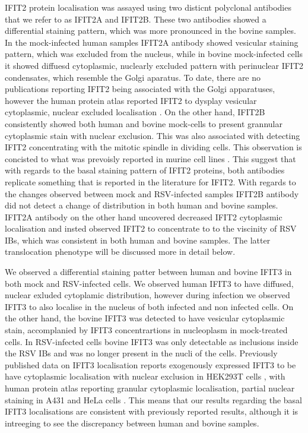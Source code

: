 IFIT2 protein localisation was assayed using two disticnt polyclonal antibodies that we refer to as IFIT2A and IFIT2B. These two antibodies showed a differential staining pattern, which was more pronounced in the bovine samples. In the mock-infected human samples IFIT2A antibody showed vesicular staining pattern, which was excluded from the nucleus, while in bovine mock-infected cells it showed diffuesd cytoplasmic, nuclearly excluded pattern with perinuclear IFIT2 condensates, which resemble the Golgi aparatus. To date, there are no publications reporting IFIT2 being associated with the Golgi apparatuses, however the human protein atlas reported IFIT2 to dysplay vesicular cytoplasmic, nuclear excluded localisation \cite{Thul2017AProteome}. On the other hand, IFIT2B consistently showed both human and bovine mock-cells to present grannular cytoplasmic stain with nuclear exclusion. This was also associated with detecting IFIT2 concentrating with the mitotic spindle in dividing cells. This observation is concisted to what was prevoisly reported in murine cell lines \cite{Saha2006IdentificationProtein}. This suggest that with regards to the basal staining pattern of IFIT2 proteins, both antibodies replicate something that is reported in the literature for IFIT2. With regards to the changes observed between mock and RSV-infected samples IFIT2B antibody did not detect a change of distribution in both human and bovine samples. IFIT2A antibody on the other hand uncovered decreased IFIT2 cytoplasmic localisation and insted observed IFIT2 to concentrate to to the viscinity of RSV IBs, which was consistent in both human and bovine samples. The latter translocation phenotype will be discussed more in detail below.

We observed a differential staining patter between human and bovine IFIT3 in both mock and RSV-infected cells. We observed human IFIT3 to have diffused, nuclear exluded cytoplamic distribution, however during infection we observed IFIT3 to also localise in the nucleus of both infected and non infected cells. On the other hand, the bovine IFIT3 was detected to have vesicular cytoplasmic stain, accomplanied by IFIT3 concentrartions in nucleoplasm in mock-treated cells. In RSV-infected cells bovine  IFIT3 was only detectable as inclusions inside the RSV IBs and was no longer present in the nucli of the cells. Previously published data on IFIT3 localisation reports exogenously expressed IFIT3 to be have cytoplasmic localisation with nuclear exclusion in HEK293T cells \cite{Huang2008Interferon-inducedCells, Liu2011IFN-InducedTBK1}, with human protein atlas reporting granular cytoplasmic localisation, partial nuclear staining in A431 and HeLa cells \cite{Thul2017AProteome}. This means that our results regarding the basal IFIT3 localisations are consistent with previously reported results, although it is intreeging to see the discrepancy between human and bovine samples.





